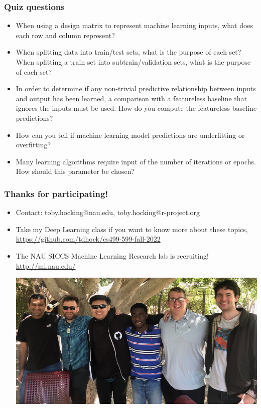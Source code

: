 \documentclass{beamer}
\begin{document}
\begin{frame}
  \frametitle{Quiz questions}
  \begin{itemize}
\item When using a design matrix to represent machine learning inputs,
  what does each row and column represent?
\item When splitting data into train/test sets, what is the purpose of
  each set? When splitting a train set into subtrain/validation sets,
  what is the purpose of each set?
\item In order to determine if any non-trivial predictive relationship
  between inputs and output has been learned, a comparison with a
  featureless baseline that ignores the inputs must be used. How do you compute
  the featureless baseline predictions?
\item How can you tell if machine learning model predictions are
  underfitting or overfitting?
\item Many learning algorithms require input of the number of
  iterations or epochs. How should this parameter be
  chosen?
  \end{itemize}
\end{frame}
 
\begin{frame}
  \frametitle{Thanks for participating!}
  \begin{itemize}
  \item Contact: toby.hocking@nau.edu, toby.hocking@r-project.org
  \item Take my Deep Learning class if you want to know more about
    these topics, \url{https://github.com/tdhock/cs499-599-fall-2022}
  \item The NAU SICCS Machine Learning Research lab is recruiting!
    \url{http://ml.nau.edu/}

\includegraphics[width=\textwidth]{2023-04-14-ASU-ML-Day}

  \end{itemize}
\end{frame}
 
\end{document}
